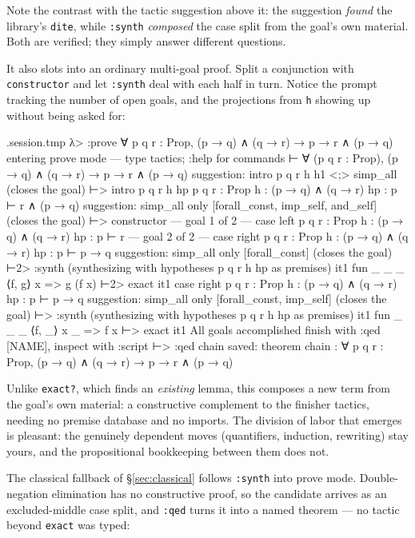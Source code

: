 \documentclass[11pt,oneside]{article}
\newcommand{\code}[1]{\texttt{#1}}
\newenvironment{session}
 {\VerbatimEnvironment\begin{VerbatimOut}{\jobname.session.tmp}}
 {\end{VerbatimOut}%
  \begin{sessionouter}%
  \VerbatimInput[fontsize=\footnotesize, breaklines=true,
    breaksymbolleft={\textcolor{stone}{\footnotesize$\hookrightarrow$}},
    formatcom=\color{ink}, tabsize=4]{\jobname.session.tmp}%
  \end{sessionouter}}
\begin{document}
Note the contrast with the tactic suggestion above it: the suggestion
\emph{found} the library's \code{dite}, while \code{:synth}
\emph{composed} the case split from the goal's own material. Both are
verified; they simply answer different questions.

It also slots into an ordinary multi-goal proof. Split a conjunction
with \code{constructor} and let \code{:synth} deal with each half in
turn. Notice the prompt tracking the number of open goals, and the
projections from \code{h} showing up without being asked for:

\begin{session}
λ> :prove ∀ p q r : Prop, (p → q) ∧ (q → r) → p → r ∧ (p → q)
entering prove mode — type tactics; :help for commands
⊢ ∀ (p q r : Prop), (p → q) ∧ (q → r) → p → r ∧ (p → q)
suggestion: intro p q r h h1 <;> simp_all  (closes the goal)
⊢> intro p q r h hp
p q r : Prop
h : (p → q) ∧ (q → r)
hp : p
⊢ r ∧ (p → q)
suggestion: simp_all only [forall_const, imp_self, and_self]  (closes the goal)
⊢> constructor
— goal 1 of 2 —
case left
p q r : Prop
h : (p → q) ∧ (q → r)
hp : p
⊢ r
— goal 2 of 2 —
case right
p q r : Prop
h : (p → q) ∧ (q → r)
hp : p
⊢ p → q
suggestion: simp_all only [forall_const]  (closes the goal)
⊢2> :synth
(synthesizing with hypotheses p q r h hp as premises)
  it1  fun _ _ _ ⟨f, g⟩ x => g (f x)
⊢2> exact it1
case right
p q r : Prop
h : (p → q) ∧ (q → r)
hp : p
⊢ p → q
suggestion: simp_all only [forall_const, imp_self]  (closes the goal)
⊢> :synth
(synthesizing with hypotheses p q r h hp as premises)
  it1  fun _ _ _ ⟨f, _⟩ x _ => f x
⊢> exact it1
All goals accomplished
finish with :qed [NAME], inspect with :script
⊢> :qed chain
saved: theorem chain : ∀ p q r : Prop, (p → q) ∧ (q → r) → p → r ∧ (p → q)
\end{session}

Unlike \code{exact?}, which finds an \emph{existing} lemma, this
composes a new term from the goal's own material: a constructive
complement to the finisher tactics, needing no premise database and
no imports. The division of labor that
emerges is pleasant: the genuinely dependent moves (quantifiers,
induction, rewriting) stay yours, and the propositional bookkeeping
between them does not.

The classical fallback of \S\ref{sec:classical} follows \code{:synth}
into prove mode. Double-negation elimination has no constructive
proof, so the candidate arrives as an excluded-middle case split, and
\code{:qed} turns it into a named theorem --- no tactic beyond
\code{exact} was typed:
\end{document}
